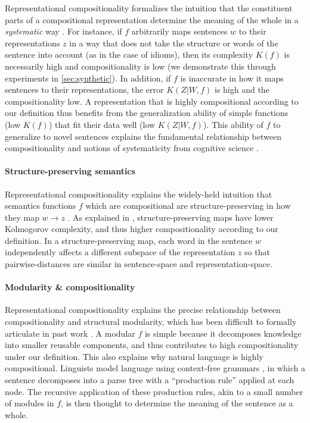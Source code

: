 \documentclass{article} %
\newcommand{\Comp}{Representational compositionality}
\begin{document}
\Comp{} formalizes the intuition that the constituent parts of a compositional representation determine the meaning of the whole in a \emph{systematic} way \citep{sep-compositionality,gendler2012case}. For instance, if $f$ arbitrarily maps sentences $w$ to their representations $z$ in a way that does not take the structure or words of the sentence into account (as in the case of idioms), then its complexity $K(f)$ is necessarily high and compositionality is low (we demonstrate this through experiments in \cref{sec:synthetic}). In addition, if $f$ is inaccurate in how it maps sentences to their representations, the error $K(Z|W,f)$ is high and the compositionality low. A representation that is highly compositional according to our definition thus benefits from the generalization ability of simple functions (low $K(f)$) that fit their data well (low $K(Z|W,f)$). This ability of $f$ to generalize to novel sentences explains the fundamental relationship between compositionality and notions of systematicity from cognitive science \citep{sep-compositionality}.

\paragraph{Structure-preserving semantics}

\Comp{} explains the widely-held intuition that semantics functions $f$ which are compositional are structure-preserving in how they map $w \rightarrow z$ \citep{montague1970english}. As explained in \citet{ren2023improving}, structure-preserving maps have lower Kolmogorov complexity, and thus higher compositionality according to our definition. In a structure-preserving map, each word in the sentence $w$ independently affects a different subspace of the representation $z$ so that pairwise-distances are similar in sentence-space and representation-space. 

\paragraph{Modularity \& compositionality}

\Comp{} explains the precise relationship between compositionality and structural modularity, which has been difficult to formally articulate in past work \citep{lepori2023break,goyal2022inductive,mittal2022modular}. A modular $f$ is simple because it decomposes knowledge into smaller reusable components, and thus contributes to high compositionality under our definition. This also explains why natural language is highly compositional. Linguists model language using context-free grammars \citep{chomsky1956three}, in which a sentence decomposes into a parse tree with a ``production rule'' applied at each node. The recursive application of these production rules, akin to a small number of modules in $f$, is then thought to determine the meaning of the sentence as a whole.
\end{document}
